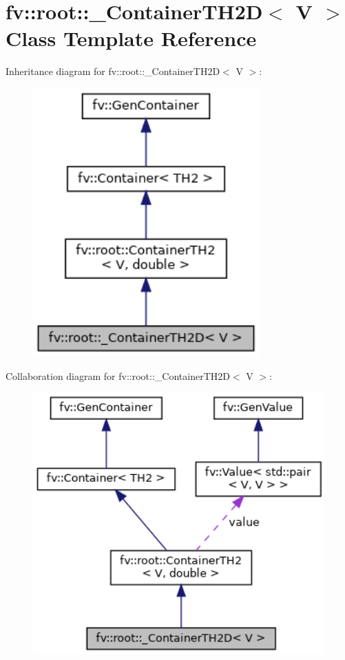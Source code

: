 \hypertarget{classfv_1_1root_1_1__ContainerTH2D}{}\section{fv\+:\+:root\+:\+:\+\_\+\+Container\+T\+H2D$<$ V $>$ Class Template Reference}
\label{classfv_1_1root_1_1__ContainerTH2D}


Inheritance diagram for fv\+:\+:root\+:\+:\+\_\+\+Container\+T\+H2D$<$ V $>$\+:
\nopagebreak
\begin{figure}[H]
\begin{center}
\leavevmode
\includegraphics[width=246pt]{classfv_1_1root_1_1__ContainerTH2D__inherit__graph}
\end{center}
\end{figure}


Collaboration diagram for fv\+:\+:root\+:\+:\+\_\+\+Container\+T\+H2D$<$ V $>$\+:
\nopagebreak
\begin{figure}[H]
\begin{center}
\leavevmode
\includegraphics[width=330pt]{classfv_1_1root_1_1__ContainerTH2D__coll__graph}
\end{center}
\end{figure}
